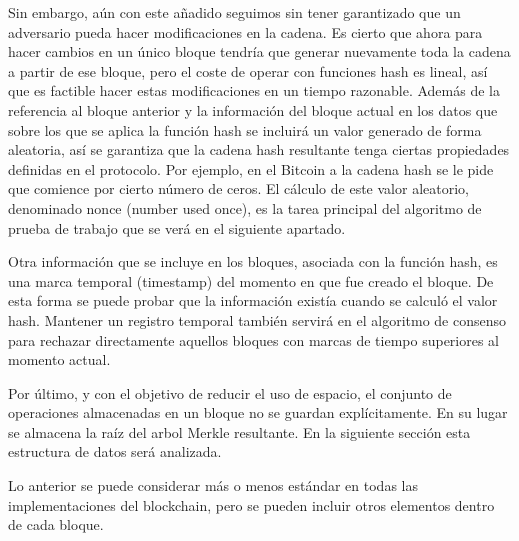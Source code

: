 Sin embargo, aún con este añadido seguimos sin tener garantizado que un adversario pueda hacer modificaciones en la cadena. Es cierto que ahora para hacer cambios en un único bloque tendría que generar nuevamente toda la cadena a partir de ese bloque, pero el coste de operar con funciones hash es lineal, así que es factible hacer estas modificaciones en un tiempo razonable. Además de la referencia al bloque anterior y la información del bloque actual en los datos que sobre los que se aplica la función hash se incluirá un valor generado de forma aleatoria, así se garantiza que la cadena hash resultante tenga ciertas propiedades definidas en el protocolo. Por ejemplo, en el Bitcoin a la cadena hash se le pide que comience por cierto número de ceros. El cálculo de este valor aleatorio, denominado nonce (number used once), es la tarea principal del algoritmo de prueba de trabajo que se verá en el siguiente apartado.

Otra información que se incluye en los bloques, asociada con la función hash, es una marca temporal (timestamp) del momento en que fue creado el bloque. De esta forma se puede probar que la información existía cuando se calculó el valor hash. Mantener un registro temporal también servirá en el algoritmo de consenso para rechazar directamente aquellos bloques con marcas de tiempo superiores al momento actual.

Por último, y con el objetivo de reducir el uso de espacio, el conjunto de operaciones almacenadas en un bloque no se guardan explícitamente. En su lugar se almacena la raíz del arbol Merkle resultante. En la siguiente sección esta estructura de datos será analizada.

Lo anterior se puede considerar más o menos estándar en todas las implementaciones del blockchain, pero se pueden incluir otros elementos dentro de cada bloque.
\begin{figure}[H]
  \qquad

	\label{fig:blockchain}%
\end{figure}

